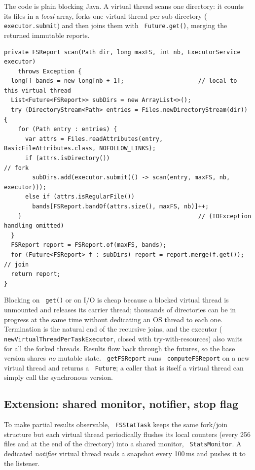 \documentclass[11pt,a4paper]{article}
\newcommand{\code}[1]{\texttt{\hyphenchar\font=-1 #1}}
\begin{document}
The code is plain blocking Java. A virtual thread scans one directory: it counts its files in a
\emph{local} array, forks one virtual thread per sub-directory (\code{executor.submit}) and then joins
them with \code{Future.get()}, merging the returned immutable reports.

\begin{lstlisting}
private FSReport scan(Path dir, long maxFS, int nb, ExecutorService executor)
    throws Exception {
  long[] bands = new long[nb + 1];                     // local to this virtual thread
  List<Future<FSReport>> subDirs = new ArrayList<>();
  try (DirectoryStream<Path> entries = Files.newDirectoryStream(dir)) {
    for (Path entry : entries) {
      var attrs = Files.readAttributes(entry, BasicFileAttributes.class, NOFOLLOW_LINKS);
      if (attrs.isDirectory())                                       // fork
        subDirs.add(executor.submit(() -> scan(entry, maxFS, nb, executor)));
      else if (attrs.isRegularFile())
        bands[FSReport.bandOf(attrs.size(), maxFS, nb)]++;
    }                                                  // (IOException handling omitted)
  }
  FSReport report = FSReport.of(maxFS, bands);
  for (Future<FSReport> f : subDirs) report = report.merge(f.get());   // join
  return report;
}
\end{lstlisting}

Blocking on \code{get()} or on I/O is cheap because a blocked virtual thread is unmounted and
releases its carrier thread; thousands of directories can be in progress at the same time without
dedicating an OS thread to each one. Termination is the natural end of the recursive joins, and the
executor (\code{newVirtualThreadPerTaskExecutor}, closed with try-with-resources) also waits for all
the forked threads. Results flow back through the futures, so the base version shares \emph{no}
mutable state. \code{getFSReport} runs \code{computeFSReport} on a new virtual thread and returns a
\code{Future}; a caller that is itself a virtual thread can simply call the synchronous version.

\subsection{Extension: shared monitor, notifier, stop flag}

To make partial results observable, \code{FSStatTask} keeps the same fork/join structure but each
virtual thread periodically flushes its local counters (every 256 files and at the end of the
directory) into a shared monitor, \code{StatsMonitor}. A dedicated \emph{notifier} virtual thread
reads a snapshot every 100\,ms and pushes it to the listener.
\end{document}
